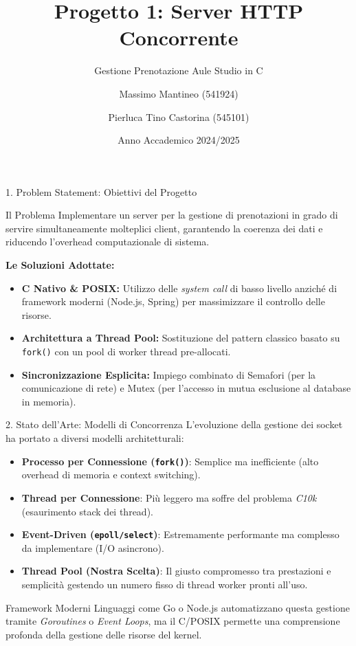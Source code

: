 \documentclass[aspectratio=169, 10pt]{beamer}
\title[Server HTTP Concorrente POSIX]{Progetto 1: Server HTTP Concorrente}
\subtitle{Gestione Prenotazione Aule Studio in C}
\author[Mantineo, Castorina]{Massimo Mantineo (541924) \and Pierluca Tino Castorina (545101)}
\institute[UniMe]{Università degli Studi di Messina \\ Dipartimento MIFT - Laurea in Informatica}
\date{Anno Accademico 2024/2025}
\begin{document}
\begin{frame}
    \titlepage
\end{frame}

\begin{frame}{1. Problem Statement: Obiettivi del Progetto}
    \begin{block}{Il Problema}
        Implementare un server per la gestione di prenotazioni in grado di servire simultaneamente molteplici client, garantendo la coerenza dei dati e riducendo l'overhead computazionale di sistema.
    \end{block}
    
    \vspace{0.3cm}
    
    \textbf{Le Soluzioni Adottate:}
    \begin{itemize}
        \item \textbf{C Nativo \& POSIX:} Utilizzo delle \textit{system call} di basso livello anziché di framework moderni (Node.js, Spring) per massimizzare il controllo delle risorse.
        \item \textbf{Architettura a Thread Pool:} Sostituzione del pattern classico basato su \texttt{fork()} con un pool di worker thread pre-allocati.
        \item \textbf{Sincronizzazione Esplicita:} Impiego combinato di Semafori (per la comunicazione di rete) e Mutex (per l'accesso in mutua esclusione al database in memoria).
    \end{itemize}
\end{frame}

\begin{frame}{2. Stato dell'Arte: Modelli di Concorrenza}
    L'evoluzione della gestione dei socket ha portato a diversi modelli architetturali:
    
    \begin{itemize}
        \item \textbf{Processo per Connessione (\texttt{fork()})}: Semplice ma inefficiente (alto overhead di memoria e context switching).
        \item \textbf{Thread per Connessione}: Più leggero ma soffre del problema \textit{C10k} (esaurimento stack dei thread).
        \item \textbf{Event-Driven (\texttt{epoll/select})}: Estremamente performante ma complesso da implementare (I/O asincrono).
        \item \textbf{Thread Pool (Nostra Scelta)}: Il giusto compromesso tra prestazioni e semplicità gestendo un numero fisso di thread worker pronti all'uso.
    \end{itemize}
    
    \begin{block}{Framework Moderni}
        Linguaggi come Go o Node.js automatizzano questa gestione tramite \textit{Goroutines} o \textit{Event Loops}, ma il C/POSIX permette una comprensione profonda della gestione delle risorse del kernel.
    \end{block}
\end{frame}
\end{document}
